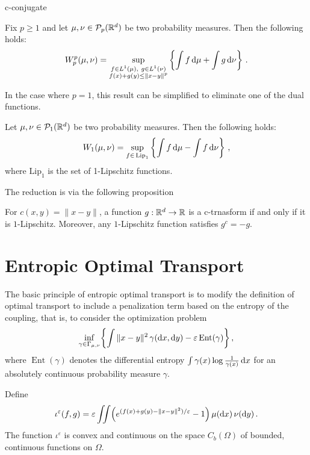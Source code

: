 c-conjugate

\begin{theorem}\label{thm:Wpduality}
Fix $p \ge 1$ and let $\mu, \nu \in \mathcal{P}_p(\mathbb{R}^d)$ be two probability measures. Then the following holds:
\begin{equation}
\label{eq:Wpduality}
W_p^p(\mu, \nu) =\sup_{\substack{f \in  L^1(\mu),\ g \in L^1(\nu
)\\f(x)+g(y) \le \|x-y\|^p }}\left\{\int f\, \mathrm{d} \mu + \int g\, \mathrm{d} \nu\right\}\,.
\end{equation}
\end{theorem}
In the case where $p=1$, this result can be simplified to eliminate one of the dual functions.
\begin{theorem}\label{thm:W1duality}
Let $\mu, \nu \in \mathcal{P}_1(\mathbb{R}^d)$ be two probability measures. Then the following holds:
\begin{equation}\label{eq:W1duality}
W_1(\mu, \nu) =\sup_{f \in \, \mathrm{Lip}_1}\left\{\int f\, \mathrm{d} \mu - \int f\, \mathrm{d} \nu\right\}\,,
\end{equation}
where $\mathrm{Lip}_1$ is the set of 1-Lipschitz functions.
\end{theorem}

The reduction is via the following proposition
\begin{proposition}
    For $c(x,y)=\|x-y\|$, a function $g:\mathbb{R}^d\to\mathbb{R}$ is a c-trnasform if and only if it is $1$-Lipschitz.
    Moreover, any $1$-Lipschitz function satisfies $g^c=-g$.
\end{proposition}


\section{Entropic Optimal Transport}

The basic principle of entropic optimal transport is to modify the definition of optimal transport to include a penalization term based on the entropy of the coupling, that is, to consider the optimization problem
\begin{equation}\label{eq:eot_cont}
	\inf_{\gamma \in \Gamma_{\mu, \nu}} \biggl\{\int \|x - y\|^2 \, \gamma(\mathrm{d} x, \mathrm{d} y) - \varepsilon \operatorname{Ent}(\gamma)\biggr\}\,,
\end{equation}
where $\operatorname{Ent}(\gamma)$ denotes the differential entropy $\int \gamma(x) \log \frac{1}{\gamma(x)} \, \mathrm{d} x$ for an absolutely continuous probability measure $\gamma$.

Define
\begin{equation*}
	\iota^\varepsilon(f, g) = \varepsilon \iint \Bigl(e^{(f(x) + g(y) - \|x - y\|^2)/\varepsilon}  - 1\Bigr) \, \mu(\mathrm{d} x)\, \nu(\mathrm{d} y)\,.
\end{equation*}
The function $\iota^\varepsilon$ is convex and continuous on the space $C_b(\Omega)$ of bounded, continuous functions on $\Omega$.

